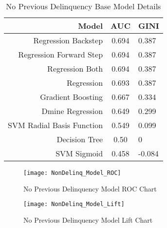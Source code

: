 \begin{table}[H]
	\centering
	\begin{tabular}{r | c | l}
		\hline
		\textbf{Model} & \textbf{AUC} & \textbf{GINI} \\
		\hline
		Regression Backstep          & 0.694        & 0.387 \\
		Regression Forward Step          & 0.694        & 0.387 \\
		Regression Both          & 0.694        & 0.387 \\
		Regression          & 0.693        & 0.387 \\
		Gradient Boosting          & 0.667        & 0.334 \\
		Dmine Regression          & 0.649        & 0.299 \\
		SVM Radial Basis Function          & 0.549        & 0.099 \\
		Decision Tree          & 0.50        & 0 \\
		SVM Sigmoid         & 0.458        & -0.084 \\
		\hline
	\end{tabular}
	\caption{No Previous Delinquency Base Model Details}
\end{table}

\begin{figure}[H]
	\texttt{[image: NonDelinq\_Model\_ROC]}
	\caption{No Previous Delinquency Model ROC Chart}
	\label{fig:NonDelinq_Model_ROC}
\end{figure}

\begin{figure}[H]
	\texttt{[image: NonDelinq\_Model\_Lift]}
	\caption{No Previous Delinquency Model Lift Chart}
	\label{fig:NonDelinq_Model_Lift}
\end{figure}

